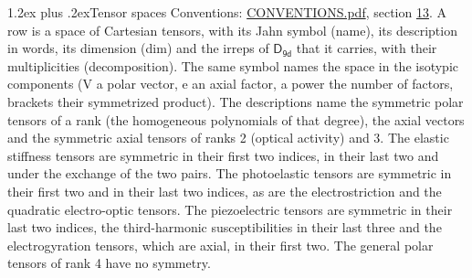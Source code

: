 \documentclass[10pt,a4paper]{article}
\makeatletter
\renewcommand\section{\@startsection{section}{1}{\z@}{-3ex plus -1ex minus -.2ex}%
  {1.2ex plus .2ex}{\normalfont\large\sffamily\bfseries\color{parttitle}}}
\numberwithin{equation}{section}
\newcommand{\grp}[1]{\mathsf{#1}}
\makeatother
\begin{document}
\section{Tensor spaces}\label{s:tensor_spaces}
Conventions: \href{../../CONVENTIONS.pdf}{CONVENTIONS.pdf}, section \href{../../CONVENTIONS.pdf\#conv.13}{13}.
\leavevmode\label{n:head.name}\label{n:head.description}\label{n:head.dim}\label{n:head.decomposition}A row is a space of Cartesian tensors, with its Jahn symbol (name), its description in words, its dimension (dim) and the irreps of $\grp{D_{9d}}$ that it carries, with their multiplicities (decomposition). \label{n:label.jahn}The same symbol names the space in the isotypic components (V a polar vector, e an axial factor, a power the number of factors, brackets their symmetrized product). The descriptions name the symmetric polar tensors of a rank (the homogeneous polynomials of that degree), the axial vectors and the symmetric axial tensors of ranks 2 (optical activity) and 3. The elastic stiffness tensors are symmetric in their first two indices, in their last two and under the exchange of the two pairs. The photoelastic tensors are symmetric in their first two and in their last two indices, as are the electrostriction and the quadratic electro-optic tensors. The piezoelectric tensors are symmetric in their last two indices, the third-harmonic susceptibilities in their last three and the electrogyration tensors, which are axial, in their first two. The general polar tensors of rank 4 have no symmetry.
\end{document}
